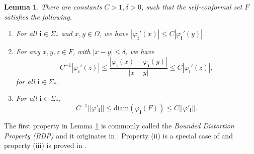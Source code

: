 \documentclass{PRM}
\newcommand{\norm}[1]{\left|\left|#1\right|\right|}
\newcommand{\diam}{\mathrm{diam}}
\theoremstyle{plain}
\newtheorem{lemma}[thm]{Lemma}
\theoremstyle{definition}
\theoremstyle{remark}
\begin{document}
\begin{lemma}\label{lemma:BDP}
There are constants $C>1,\delta>0$, such that the self-conformal set $F$ satisfies the following.

\begin{enumerate}
    \item For all $\mathbf{i}\in\Sigma_*$ and $x,y\in \Omega$, we have $|\varphi_{\mathbf{i}}'(x)|\leq C|\varphi_{\mathbf{i}}'(y)|$.
    
    \item For any $x,y,z\in F$, with $|x-y|\leq \delta$, we have
    \begin{equation*}
        C^{-1}|\varphi_{\mathbf{i}}'(z)|\leq\frac{|\varphi_{\mathbf{i}}(x)-\varphi_{\mathbf{i}}(y)|}{|x-y|}\leq C|\varphi_{\mathbf{i}}'(z)|,
    \end{equation*}
    for all $\mathbf{i}\in\Sigma_*$.

    \item For all $\mathbf{i}\in\Sigma_*$,
    \begin{equation*}
        C^{-1}\norm{\varphi'_{\mathbf{i}}}\leq\diam(\varphi_{\mathbf{i}}(F)) \leq C\norm{\varphi'_{\mathbf{i}}}.
    \end{equation*}
\end{enumerate}
\end{lemma}
The first property in Lemma \ref{lemma:BDP} is commonly called the \emph{Bounded Distortion Property (BDP)} and it originates in \cite{MU}. Property (ii) is a special case of \cite[Lemma 2.3]{Fan} and property (iii) is proved in \cite{MU}.
\end{document}

